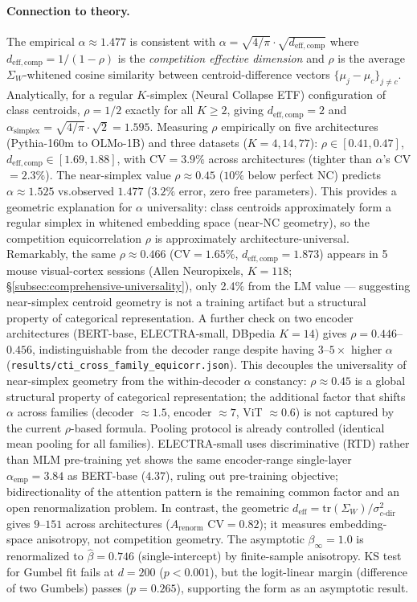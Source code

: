 \documentclass{article}
\begin{document}
\paragraph{Connection to theory.}
The empirical $\alpha\approx1.477$ is consistent with $\alpha=\sqrt{4/\pi}\cdot\sqrt{d_\mathrm{eff,comp}}$ where $d_\mathrm{eff,comp}=1/(1-\rho)$ is the \emph{competition effective dimension} and $\rho$ is the average $\Sigma_W$-whitened cosine similarity between centroid-difference vectors $\{\mu_j - \mu_c\}_{j\neq c}$.
Analytically, for a regular $K$-simplex (Neural Collapse ETF) configuration of class centroids, $\rho=1/2$ exactly for all $K\geq 2$, giving $d_\mathrm{eff,comp}=2$ and $\alpha_\mathrm{simplex}=\sqrt{4/\pi}\cdot\sqrt{2}=1.595$.
Measuring $\rho$ empirically on five architectures (Pythia-160m to OLMo-1B) and three datasets ($K=4,14,77$): $\rho\in[0.41,0.47]$, $d_\mathrm{eff,comp}\in[1.69,1.88]$, with CV$=3.9\%$ across architectures (tighter than $\alpha$'s CV$=2.3\%$).
The near-simplex value $\rho\approx0.45$ ($10\%$ below perfect NC) predicts $\alpha\approx1.525$ vs.\@ observed $1.477$ ($3.2\%$ error, zero free parameters).
This provides a geometric explanation for $\alpha$ universality: class centroids approximately form a regular simplex in whitened embedding space (near-NC geometry), so the competition equicorrelation $\rho$ is approximately architecture-universal.
Remarkably, the same $\rho\approx0.466$ (CV$=1.65\%$, $d_\mathrm{eff,comp}=1.873$) appears in 5 mouse visual-cortex sessions (Allen Neuropixels, $K=118$; \S\ref{subsec:comprehensive-universality}), only 2.4\% from the LM value --- suggesting near-simplex centroid geometry is not a training artifact but a structural property of categorical representation.
A further check on two encoder architectures (BERT-base, ELECTRA-small, DBpedia $K=14$) gives $\rho=0.446$--$0.456$, indistinguishable from the decoder range despite having $3$--$5\times$ higher $\alpha$ (\texttt{results/cti\_cross\_family\_equicorr.json}).
This decouples the universality of near-simplex geometry from the within-decoder $\alpha$ constancy: $\rho\approx0.45$ is a global structural property of categorical representation; the additional factor that shifts $\alpha$ across families (decoder $\approx1.5$, encoder $\approx7$, ViT $\approx0.6$) is not captured by the current $\rho$-based formula.
Pooling protocol is already controlled (identical mean pooling for all families).
ELECTRA-small uses discriminative (RTD) rather than MLM pre-training yet shows the same encoder-range single-layer $\alpha_\mathrm{emp}=3.84$ as BERT-base ($4.37$), ruling out pre-training objective; bidirectionality of the attention pattern is the remaining common factor and an open renormalization problem.
In contrast, the geometric $d_\mathrm{eff}=\mathrm{tr}(\Sigma_W)/\sigma_{c\text{-dir}}^2$ gives $9$--$151$ across architectures ($A_\mathrm{renorm}$ CV$=0.82$); it measures embedding-space anisotropy, not competition geometry.
The asymptotic $\beta_\infty=1.0$ is renormalized to $\hat\beta=0.746$ (single-intercept) by finite-sample anisotropy.
KS test for Gumbel fit fails at $d=200$ ($p<0.001$), but the logit-linear margin (difference of two Gumbels) passes ($p=0.265$), supporting the form as an asymptotic result.
\end{document}
